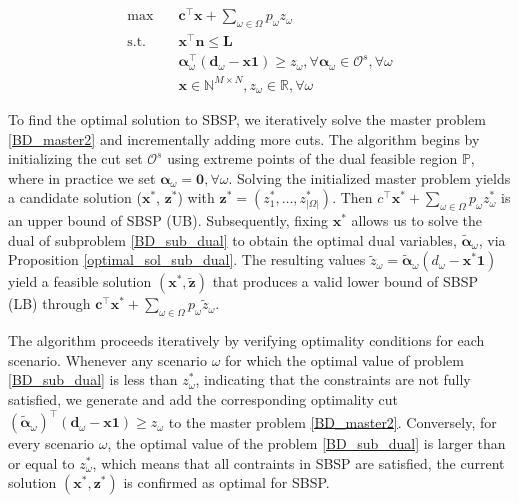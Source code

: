 \begin{equation}\label{BD_master2}
  \begin{aligned}
    \max \quad & \mathbf{c}^{\intercal} \mathbf{x} + \sum_{\omega \in \Omega} p_{\omega} z_{\omega} \\
    \text {s.t.} \quad & \mathbf{x}^{\intercal} \mathbf{n}  \leq \mathbf{L} \\
    & \bm{\alpha}_{\omega}^{\intercal}(\mathbf{d}_{\omega}- \mathbf{x} \mathbf{1}) \geq z_{\omega}, \forall \bm{\alpha}_{\omega} \in \mathcal{O}^{s}, \forall \omega \\
     & \mathbf{x} \in \mathbb{N}^{M \times N}, z_{\omega} \in \mathbb{R}, \forall \omega
  \end{aligned}
\end{equation}


To find the optimal solution to SBSP, we iteratively solve the master problem \eqref{BD_master2} and incrementally adding more cuts. The algorithm begins by initializing the cut set $\mathcal{O}^{s}$ using extreme points of the dual feasible region $\mathbb{P}$, where in practice we set $\bm{\alpha}_{\omega} = \mathbf{0}, \forall \omega$. Solving the initialized master problem yields a candidate solution ($\mathbf{x}^{*}$, $\mathbf{z}^{*}$) with $\mathbf{z}^{*} =(z^{*}_1,\ldots, z^{*}_{|\Omega|})$. Then $c^{\intercal} \mathbf{x}^{*} + \sum_{\omega \in \Omega} p_{\omega} z_{\omega}^{*}$ is an upper bound of SBSP (UB). Subsequently, fixing $\mathbf{x}^{*}$ allows us to solve the dual of subproblem \eqref{BD_sub_dual} to obtain the optimal dual variables, $\bm{\tilde{\alpha}}_{\omega}$, via Proposition \ref{optimal_sol_sub_dual}. The resulting values $\tilde{z}_{\omega} = \bm{\tilde{\alpha}}_{\omega}(d_{\omega} - \mathbf{x}^{*} \mathbf{1})$ yield a feasible solution $(\mathbf{x}^{*}, \mathbf{\tilde{z}})$ that produces a valid lower bound of SBSP (LB) through $\mathbf{c}^{\intercal} \mathbf{x}^{*} + \sum_{\omega \in \Omega} p_{\omega} \tilde{z}_{\omega}$.

The algorithm proceeds iteratively by verifying optimality conditions for each scenario. Whenever any scenario $\omega$ for which the optimal value of problem \eqref{BD_sub_dual} is less than $z_{\omega}^{*}$, indicating that the constraints are not fully satisfied, we generate and add the corresponding optimality cut $(\bm{\tilde{\alpha}}_{\omega})^{\intercal}(\mathbf{d}_{\omega} - \mathbf{x} \mathbf{1}) \geq z_{\omega}$ to the master problem \eqref{BD_master2}. Conversely, for every scenario $\omega$, the optimal value of the problem \eqref{BD_sub_dual} is larger than or equal to $z_{\omega}^{*}$, which means that all contraints in SBSP are satisfied, the current solution $(\mathbf{x}^{*}, \mathbf{z}^{*})$ is confirmed as optimal for SBSP.

